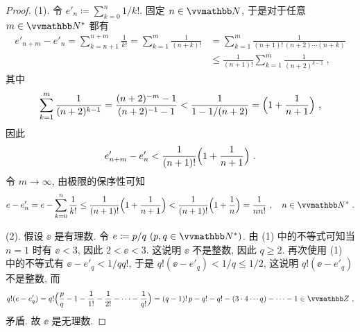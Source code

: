 \begin{proof}
    (1). 令 \(e'_n \coloneqq \sum_{k = 0}^n 1 / k!\). 固定 \(n \in \N\), 于是对于任意 \(m \in \N^\ast\) 都有
    \begin{align*}
        e'_{n + m} - e'_n = \sum_{k = n + 1}^{n + m} \frac{1}{k!} = \sum_{k = 1}^m \frac{1}{(n + k)!} &= \sum_{k = 1}^m \frac{1}{(n + 1)!\, (n + 2) \cdots (n + k)}\\
        &\leq \frac{1}{(n + 1)!} \sum_{k = 1}^m \frac{1}{(n + 2)^{k - 1}}\ ,
    \end{align*}
    其中
    \[
        \sum_{k = 1}^m \frac{1}{(n + 2)^{k - 1}} = \frac{(n + 2)^{- m} - 1}{(n + 2)^{-1} - 1} < \frac{1}{1 - 1 / (n + 2)} = \Bigl(1 + \frac{1}{n + 1}\Bigr)\ ,
    \]
    因此
    \[
        e'_{n + m} - e'_n < \frac{1}{(n + 1)!} \Bigl(1 + \frac{1}{n + 1}\Bigr)\ .
    \]
    令 \(m \to \infty\), 由极限的保序性可知
    \[
        \ee - e'_n = \ee - \sum_{k = 0}^n \frac{1}{k!} \leq \frac{1}{(n + 1)!} \Bigl(1 + \frac{1}{n + 1}\Bigr) < \frac{1}{(n + 1)!} \Bigl(1 + \frac{1}{n}\Bigr) = \frac{1}{n n!}\ ,\quad n \in \N^\ast\ .
    \]

    (2). 假设 \(\ee\) 是有理数. 令 \(\ee \coloneq p / q\ (p, q \in \N^\ast)\). 由 (1) 中的不等式可知当 \(n = 1\) 时有 \(\ee < 3\), 因此 \(2 < \ee < 3\). 这说明 \(\ee\) 不是整数, 因此 \(q \geq 2\). 再次使用 (1) 中的不等式有 \(\ee - e'_q < 1 / q q!\), 于是 \(q! (\ee - e'_q) < 1 / q \leq 1 / 2\), 这说明 \(q! (\ee - e'_q)\) 不是整数, 而
    \[
        q! (\ee - e'_q) = q! \Bigl(\frac{p}{q} - 1 - \frac{1}{1!} - \frac{1}{2!} - \cdots - \frac{1}{q!}\Bigr) = (q - 1)!\, p - q! - q! - (3 \cdot 4 \cdots q) - \cdots - 1 \in \Z\ ,
    \]
    矛盾. 故 \(\ee\) 是无理数.
\end{proof}

